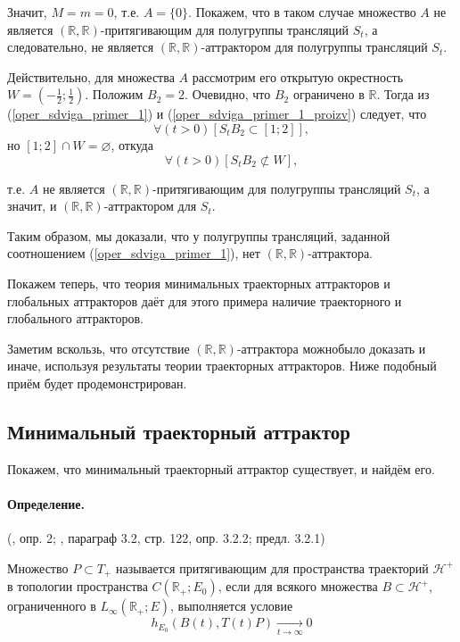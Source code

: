 Значит, $M=m=0$, т.е. $A=\{0\}$.
Покажем, что в таком случае множество $A$ не является $(\mathbb{R},\mathbb{R})$-притягивающим для полугруппы трансляций $S_t$, а следовательно, не является $(\mathbb{R},\mathbb{R})$-аттрактором для полугруппы трансляций $S_t$.

Действительно, для множества $A$ рассмотрим его открытую окрестность $ W = (-\frac12;\frac12)$.
Положим $B_2={2}$.
Очевидно, что $B_2$ ограничено в $\mathbb{R}$.
Тогда из (\ref{oper_sdviga_primer_1}) и (\ref{oper_sdviga_primer_1_proizv}) следует, что
$$
	\forall(t>0)[S_t B_2 \subset [1; 2]],
$$
но $[1;2]\cap W = \varnothing$, откуда
$$
	\forall(t>0)[S_t B_2 \not\subset W],
$$

т.е. $A$ не является $(\mathbb{R},\mathbb{R})$-притягивающим для полугруппы трансляций $S_t$,
а значит, и $(\mathbb{R},\mathbb{R})$-аттрактором для $S_t$.

Таким образом, мы доказали, что у полугруппы трансляций, заданной соотношением (\ref{oper_sdviga_primer_1}),
нет $(\mathbb{R},\mathbb{R})$-аттрактора.

Покажем теперь, что теория минимальных траекторных аттракторов и глобальных аттракторов
даёт для этого примера наличие траекторного и глобального аттракторов.

Заметим вскользь, что отсутствие $(\mathbb{R},\mathbb{R})$-аттрактора можнобыло доказать и иначе,
используя результаты теории траекторных аттракторов.
Ниже подобный приём будет продемонстрирован.

\subsection{Минимальный траекторный аттрактор}

Покажем, что минимальный траекторный аттрактор существует, и найдём его.

\paragraph{Определение.} (\cite{zhidkosti_s_pamyatyu}, опр. 2; \cite{Zelenaya}, параграф 3.2, стр. 122, опр. 3.2.2; предл. 3.2.1)

Множество $P \subset T_+$ называется притягивающим для пространства траекторий $\mathcal{H}^+$ в топологии пространства $C(\mathbb{R}_+; E_0)$,
если для всякого множества $B \subset \mathcal{H}^+$, ограниченного в $L_{\infty}(\mathbb{R}_+;E)$, выполняется условие
\begin{equation}
	h_{E_0}(B(t),T(t)P) \xrightarrow[t\to\infty]{}0
\end{equation}

